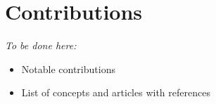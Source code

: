     



    
\section{Contributions}\label{s:Contributions}
    \emph{To be done here:}
    \begin{itemize}
        \item  Notable contributions
        \item List of concepts and articles with references
    \end{itemize}